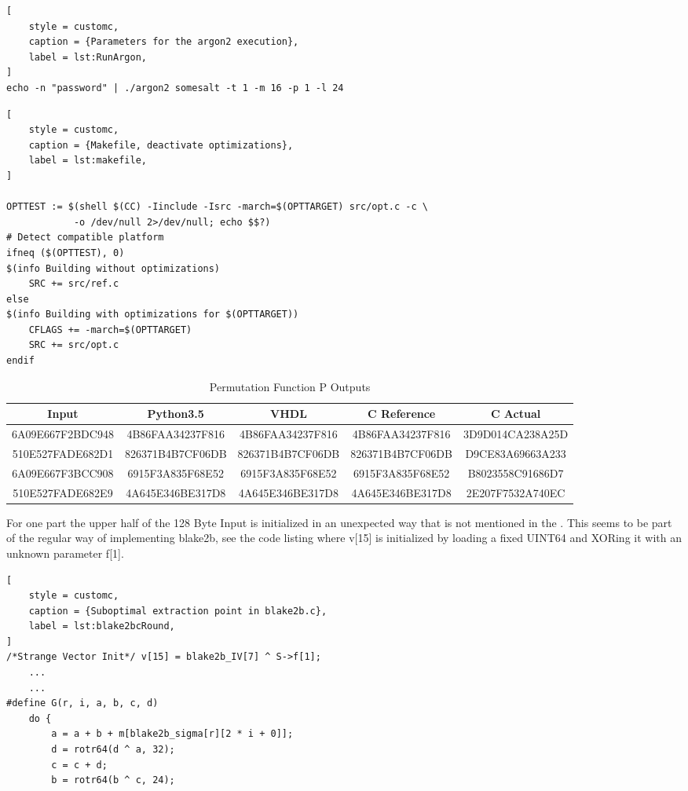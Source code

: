 \begin{lstlisting}[
	style = customc, 
	caption = {Parameters for the argon2 execution},
	label = lst:RunArgon,
]
echo -n "password" | ./argon2 somesalt -t 1 -m 16 -p 1 -l 24
\end{lstlisting}

\begin{lstlisting}[
	style = customc,
	caption = {Makefile, deactivate optimizations},
	label = lst:makefile,
]

OPTTEST := $(shell $(CC) -Iinclude -Isrc -march=$(OPTTARGET) src/opt.c -c \
			-o /dev/null 2>/dev/null; echo $$?)
# Detect compatible platform
ifneq ($(OPTTEST), 0)
$(info Building without optimizations)
	SRC += src/ref.c
else
$(info Building with optimizations for $(OPTTARGET))
	CFLAGS += -march=$(OPTTARGET)
	SRC += src/opt.c
endif
\end{lstlisting}

\begin{table}[ht]
	\centering
	\caption{Permutation Function P Outputs}
	\label{tbl:permresults}
	\begin{tabular}{c|cccc}
	\hline
	Input & Python3.5 & VHDL & C Reference & C Actual \\ 
	\hline
	 6A09E667F2BDC948 & 4B86FAA34237F816 & 4B86FAA34237F816 & 4B86FAA34237F816 & 3D9D014CA238A25D \\  
	 510E527FADE682D1 & 826371B4B7CF06DB & 826371B4B7CF06DB & 826371B4B7CF06DB & D9CE83A69663A233 \\
	 6A09E667F3BCC908 & 6915F3A835F68E52 & 6915F3A835F68E52 & 6915F3A835F68E52 & B8023558C91686D7 \\  
	 510E527FADE682E9 & 4A645E346BE317D8 & 4A645E346BE317D8 & 4A645E346BE317D8 &
	 2E207F7532A740EC \\
	 \hline
	\end{tabular}
\end{table}

For one part the upper half of the 128 Byte Input is initialized in an unexpected way that
is not mentioned in the \autocite{irtf-draft}. This seems to be part of the regular way of
implementing blake2b, see the code listing \Cref{blake2bcRound} where v[15] is initialized
by loading a fixed UINT64 and XORing it with an unknown parameter f[1]. 

\begin{lstlisting}[
	style = customc,
	caption = {Suboptimal extraction point in blake2b.c},
	label = lst:blake2bcRound,
]
/*Strange Vector Init*/ v[15] = blake2b_IV[7] ^ S->f[1];
	...
	...
#define G(r, i, a, b, c, d)                                                   
    do {                                                                       
        a = a + b + m[blake2b_sigma[r][2 * i + 0]];                            
        d = rotr64(d ^ a, 32);                                                 
        c = c + d;                                                             
        b = rotr64(b ^ c, 24);                                                 
\end{lstlisting}



